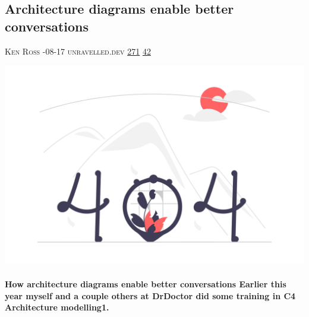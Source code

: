\documentclass[10pt,a4paper]{article}
\begin{document}
\begin{multicols*}{2}
\begin{minipage}{\linewidth}
\subsection{Architecture diagrams enable better conversations}
\textsc{\footnotesize
{\scriptsize\faUser}\space 
Ken Ross 
{\scriptsize\faCalendar}-08-17 
{\scriptsize\faGlobe}\space 
unravelled.dev 
{\scriptsize\faThumbsOUp}\space 
\href{http://news.ycombinator.com/item?id=37222855\&utm\_term=comment}{271} 
{\scriptsize\faComments}\space 
\href{http://news.ycombinator.com/item?id=37222855\&utm\_term=comment}{42} 
}
\par\medskip\noindent
\href{https://www.unravelled.dev/how-architecture-diagrams-enable-better-conversations/?utm\_source=hackernewsletter\&utm\_medium=email\&utm\_term=code}{
    \includegraphics[width=0.99\linewidth]{notfound.png}
}
\end{minipage}
\paragraph{}
\textbf{How architecture diagrams enable better conversations
Earlier this year myself and a couple others at DrDoctor did some training in C4 Architecture modelling1.}

\end{multicols*}
\end{document}
